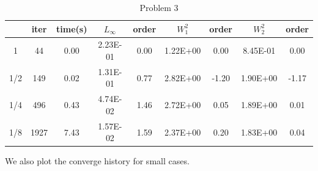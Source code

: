 \documentclass{article}
\begin{document}
\begin{table}[H]
	\centering
	\caption{Problem 3}
	\begin{tabular}{|c|c|c|c|c|c|c|c|c|}
		\hline
		& iter & time(s) & $L_{\infty}$ & order & $W_1^2$  & order & $W_2^2$  & order \\ \hline
		1   & 44   & 0.00    & 2.23E-01     & 0.00  & 1.22E+00 & 0.00  & 8.45E-01 & 0.00  \\ \hline
		1/2 & 149  & 0.02    & 1.31E-01     & 0.77  & 2.82E+00 & -1.20 & 1.90E+00 & -1.17 \\ \hline
		1/4 & 496  & 0.43    & 4.74E-02     & 1.46  & 2.72E+00 & 0.05  & 1.89E+00 & 0.01  \\ \hline
		1/8 & 1927 & 7.43    & 1.57E-02     & 1.59  & 2.37E+00 & 0.20  & 1.83E+00 & 0.04  \\ \hline
	\end{tabular}
\end{table}
We also plot the converge history for small cases.
\end{document}
